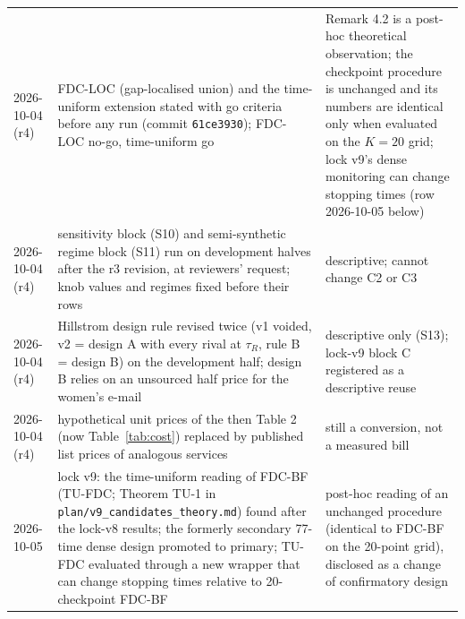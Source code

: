 \documentclass[sigconf,anonymous,review]{acmart}
\begin{document}
\begin{table}[p]
\begin{tabular}{@{}l>{\raggedright\arraybackslash}p{6.6cm}>{\raggedright\arraybackslash}p{7.6cm}@{}}
2026-10-04 (r4) & FDC-LOC (gap-localised union) and the time-uniform extension stated with go criteria before any run (commit \texttt{61ce3930}); FDC-LOC no-go, time-uniform go & Remark 4.2 is a post-hoc theoretical observation; the checkpoint procedure is unchanged and its numbers are identical only when evaluated on the $K = 20$ grid; lock v9's dense monitoring can change stopping times (row 2026-10-05 below) \\
2026-10-04 (r4) & sensitivity block (S10) and semi-synthetic regime block (S11) run on development halves after the r3 revision, at reviewers' request; knob values and regimes fixed before their rows & descriptive; cannot change C2 or C3 \\
2026-10-04 (r4) & Hillstrom design rule revised twice (v1 voided, v2 = design A with every rival at $\tau_R$, rule B = design B) on the development half; design B relies on an unsourced half price for the women's e-mail & descriptive only (S13); lock-v9 block C registered as a descriptive reuse \\
2026-10-04 (r4) & hypothetical unit prices of the then Table 2 (now Table~\ref{tab:cost}) replaced by published list prices of analogous services & still a conversion, not a measured bill \\
2026-10-05 & lock v9: the time-uniform reading of FDC-BF (TU-FDC; Theorem TU-1 in \texttt{plan/v9\_candidates\_theory.md}) found after the lock-v8 results; the formerly secondary 77-time dense design promoted to primary; TU-FDC evaluated through a new wrapper that can change stopping times relative to 20-checkpoint FDC-BF & post-hoc reading of an unchanged procedure (identical to FDC-BF on the 20-point grid), disclosed as a change of confirmatory design \\
\bottomrule
\end{tabular}
\end{table}
\end{document}
